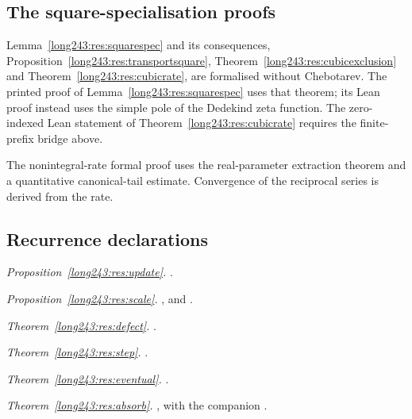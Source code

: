 \subsection*{The square-specialisation proofs}
Lemma~\ref{long243:res:squarespec} and its consequences,
Proposition~\ref{long243:res:transportsquare},
Theorem~\ref{long243:res:cubicexclusion} and
Theorem~\ref{long243:res:cubicrate}, are formalised without Chebotarev.
The printed proof of Lemma~\ref{long243:res:squarespec} uses that theorem;
its Lean proof instead uses the simple pole of the Dedekind zeta function.
The zero-indexed Lean statement of Theorem~\ref{long243:res:cubicrate}
requires the finite-prefix bridge above.

The nonintegral-rate formal proof uses the real-parameter extraction
theorem and a quantitative canonical-tail estimate. Convergence of the
reciprocal series is derived from the rate.

\subsection*{Recurrence declarations}
\noindent\emph{Proposition~\ref{long243:res:update}.} .

\noindent\emph{Proposition~\ref{long243:res:scale}.} ,
and
.

\noindent\emph{Theorem~\ref{long243:res:defect}.} .

\noindent\emph{Theorem~\ref{long243:res:step}.} .

\noindent\emph{Theorem~\ref{long243:res:eventual}.} .

\noindent\emph{Theorem~\ref{long243:res:absorb}.} , with the companion
.

